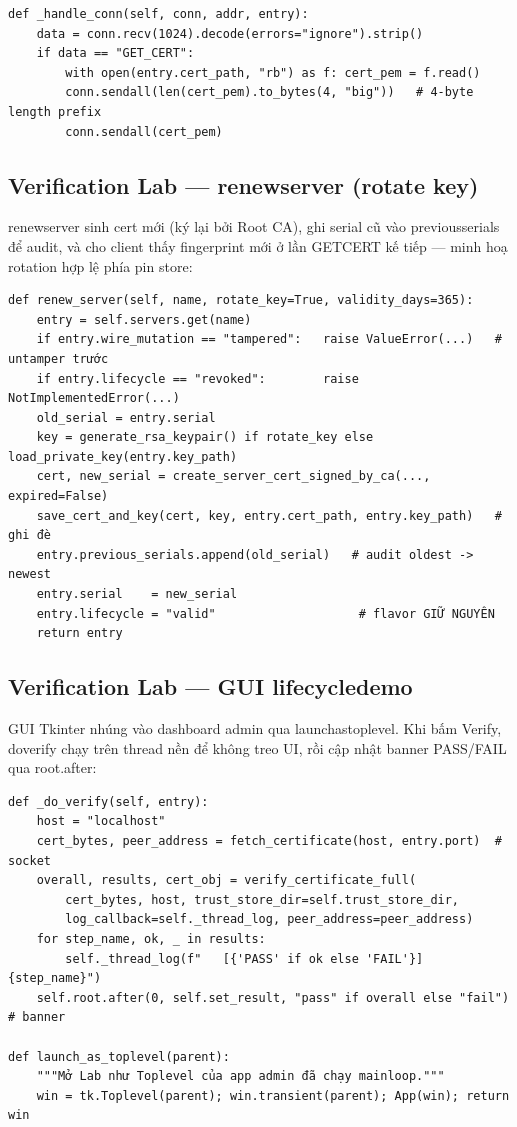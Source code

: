 \documentclass[12pt,a4paper]{article}
\newcommand{\code}[1]{{\ttfamily\small\def\_{\textunderscore\discretionary{}{}{}}#1}}
\begin{document}
\begin{Verbatim}[numbers=none]
def _handle_conn(self, conn, addr, entry):
    data = conn.recv(1024).decode(errors="ignore").strip()
    if data == "GET_CERT":
        with open(entry.cert_path, "rb") as f: cert_pem = f.read()
        conn.sendall(len(cert_pem).to_bytes(4, "big"))   # 4-byte length prefix
        conn.sendall(cert_pem)
\end{Verbatim}

\subsection{Verification Lab --- \code{renew\_server} (rotate key)}

\code{renew\_server} sinh cert mới (ký lại bởi Root CA), ghi serial cũ vào
\code{previous\_serials} để audit, và cho client thấy fingerprint mới ở lần
\code{GET\_CERT} kế tiếp --- minh hoạ rotation hợp lệ phía pin store:

\begin{Verbatim}
def renew_server(self, name, rotate_key=True, validity_days=365):
    entry = self.servers.get(name)
    if entry.wire_mutation == "tampered":   raise ValueError(...)   # untamper trước
    if entry.lifecycle == "revoked":        raise NotImplementedError(...)
    old_serial = entry.serial
    key = generate_rsa_keypair() if rotate_key else load_private_key(entry.key_path)
    cert, new_serial = create_server_cert_signed_by_ca(..., expired=False)
    save_cert_and_key(cert, key, entry.cert_path, entry.key_path)   # ghi đè
    entry.previous_serials.append(old_serial)   # audit oldest -> newest
    entry.serial    = new_serial
    entry.lifecycle = "valid"                    # flavor GIỮ NGUYÊN
    return entry
\end{Verbatim}

\subsection{Verification Lab --- GUI \code{lifecycle\_demo}}

GUI Tkinter nhúng vào dashboard admin qua \code{launch\_as\_toplevel}. Khi bấm
Verify, \code{\_do\_verify} chạy trên thread nền để không treo UI, rồi cập nhật
banner PASS/FAIL qua \code{root.after}:

\begin{Verbatim}
def _do_verify(self, entry):
    host = "localhost"
    cert_bytes, peer_address = fetch_certificate(host, entry.port)  # socket
    overall, results, cert_obj = verify_certificate_full(
        cert_bytes, host, trust_store_dir=self.trust_store_dir,
        log_callback=self._thread_log, peer_address=peer_address)
    for step_name, ok, _ in results:
        self._thread_log(f"   [{'PASS' if ok else 'FAIL'}] {step_name}")
    self.root.after(0, self.set_result, "pass" if overall else "fail")  # banner

def launch_as_toplevel(parent):
    """Mở Lab như Toplevel của app admin đã chạy mainloop."""
    win = tk.Toplevel(parent); win.transient(parent); App(win); return win
\end{Verbatim}
\end{document}
